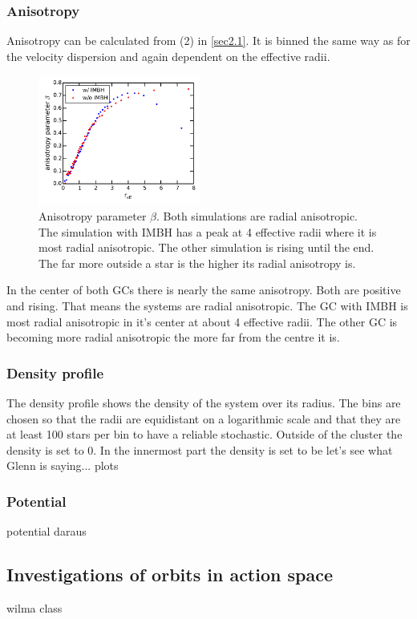 \documentclass[a4paper,12pt,abstracton]{scrartcl}
\begin{document}
\subsubsection{Anisotropy}
Anisotropy can be calculated from (2) in \ref{sec2.1}. It is binned the same way as for the velocity dispersion and again dependent on the effective radii.
\begin{figure}
	\centering
	\includegraphics[width=0.475\textwidth]{Plots/anisotropy_parameter_beta.pdf}
	\caption{Anisotropy parameter \(\beta\). Both simulations are radial anisotropic. The simulation with \ac{IMBH} has a peak at 4 effective radii where it is most radial anisotropic. The other simulation is rising until the end. The far more outside a star is the higher its radial anisotropy is.}
	\label{fig:anisotropy_param}
\end{figure}
In the center of both \ac{GC}s there is nearly the same anisotropy. Both are positive and rising. That means the systems are radial anisotropic. The \ac{GC} with \ac{IMBH} is most radial anisotropic in it's center at about 4 effective radii. The other \ac{GC} is becoming more radial anisotropic the more far from the centre it is.
\subsubsection{Density profile}
The density profile shows the density of the system over its radius. The bins are chosen so that the radii are equidistant on a logarithmic scale and that they are at least 100 stars per bin to have a reliable stochastic. Outside of the cluster the density is set to 0. In the innermost part the density is set to be \color{red} let's see what Glenn is saying... \color{black} 
plots\\


\subsubsection{Potential}
potential daraus
\subsection{Investigations of orbits in action space}
wilma class 
\end{document}
